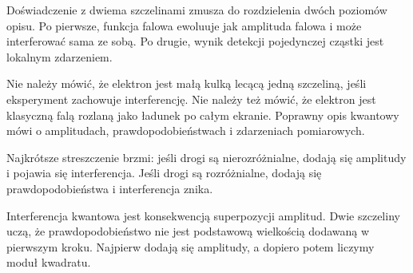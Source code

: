 Doświadczenie z dwiema szczelinami zmusza do rozdzielenia dwóch poziomów opisu. Po pierwsze, funkcja falowa ewoluuje jak amplituda falowa i może interferować sama ze sobą. Po drugie, wynik detekcji pojedynczej cząstki jest lokalnym zdarzeniem.

Nie należy mówić, że elektron jest małą kulką lecącą jedną szczeliną, jeśli eksperyment zachowuje interferencję. Nie należy też mówić, że elektron jest klasyczną falą rozlaną jako ładunek po całym ekranie. Poprawny opis kwantowy mówi o amplitudach, prawdopodobieństwach i zdarzeniach pomiarowych.

Najkrótsze streszczenie brzmi: jeśli drogi są nierozróżnialne, dodają się amplitudy i pojawia się interferencja. Jeśli drogi są rozróżnialne, dodają się prawdopodobieństwa i interferencja znika.

\begin{summarybox}
Interferencja kwantowa jest konsekwencją superpozycji amplitud. Dwie szczeliny uczą, że prawdopodobieństwo nie jest podstawową wielkością dodawaną w pierwszym kroku. Najpierw dodają się amplitudy, a dopiero potem liczymy moduł kwadratu.
\end{summarybox}
